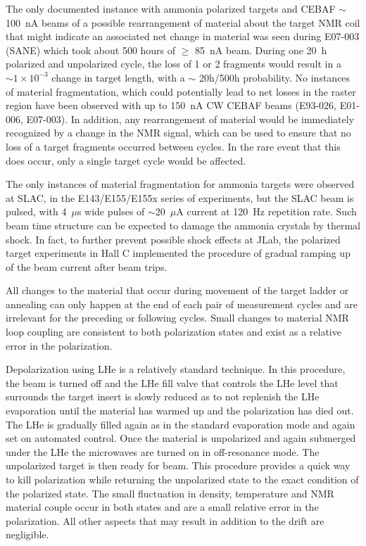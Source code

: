 The only documented instance with ammonia polarized targets and CEBAF $\sim$100~nA beams of a possible rearrangement of material about the target NMR coil that
might indicate an associated net change in material was seen during E07-003 (SANE) which took about 500 hours of $\ge$ 85~nA beam. 
During one 20~h polarized and unpolarized cycle, the loss of 1 or 2 fragments would result in a $\sim 1\times 10^{-3}$  change in target length, with a $\sim$ 20h/500h probability.
No instances of material fragmentation, which could potentially lead to net 
losses in the raster region have been observed with up to 150~nA CW CEBAF beams 
(E93-026, E01-006, E07-003).  In addition, any rearrangement of material would be immediately recognized by a change in the NMR signal, which can be
used to ensure that no loss of a target fragments occurred between cycles. In the rare event that this does occur, only a single target cycle would be affected.

The only instances of material fragmentation for ammonia targets were observed 
at SLAC, in the E143/E155/E155x series of experiments, but the SLAC beam is 
pulsed, with 4~$\mu$s wide pulses of $\sim$20~$\mu$A current at 120~Hz repetition
rate. Such beam time structure can be expected to damage the ammonia crystals by
thermal shock. In fact, to further prevent possible shock effects at JLab, the 
polarized target experiments in Hall C implemented the procedure of gradual
ramping up of the beam current after beam trips.

All changes to the material that occur during movement of the target ladder or
annealing can only happen at the end of each pair of measurement cycles and are
irrelevant for the preceding or following cycles.  Small changes to material
NMR loop coupling are consistent to both polarization states and exist as
a relative error in the polarization.

Depolarization using LHe is a relatively standard technique.  In this procedure, the
beam is turned off and the LHe fill valve that controls the
LHe level that surrounds the target insert is slowly reduced as to not replenish
the LHe evaporation until the material has warmed up and the polarization has died out.
The LHe is gradually filled again as in the standard evaporation mode and again set on
automated control.  Once the material is unpolarized and again submerged under
the LHe the microwaves are turned on in off-resonance mode.  The unpolarized target
is then ready for beam.  This procedure provides a quick way to kill polarization while
returning the unpolarized state to the exact condition of the polarized state.  The
small fluctuation in density, temperature and NMR material couple occur in both states
and are a small relative error in the polarization.  All other aspects that may result
in addition to the drift are negligible. 

